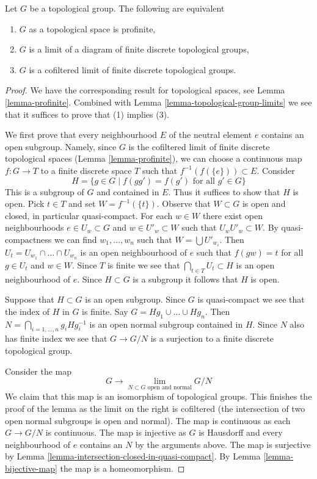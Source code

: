 \begin{lemma}
\label{lemma-profinite-group}
Let $G$ be a topological group. The following are equivalent
\begin{enumerate}
\item $G$ as a topological space is profinite,
\item $G$ is a limit of a diagram of finite discrete topological groups,
\item $G$ is a cofiltered limit of finite discrete topological groups.
\end{enumerate}
\end{lemma}

\begin{proof}
We have the corresponding result for topological spaces, see
Lemma \ref{lemma-profinite}. Combined with
Lemma \ref{lemma-topological-group-limits}
we see that it suffices to prove that (1) implies (3).

\medskip\noindent
We first prove that every neighbourhood $E$ of the neutral element $e$ contains
an open subgroup. Namely, since $G$ is the cofiltered limit of finite
discrete topological spaces (Lemma \ref{lemma-profinite}),
we can choose a continuous map $f : G \to T$ to a finite discrete
space $T$ such that $f^{-1}(f(\{e\})) \subset E$.
Consider
$$
H = \{g \in G \mid f(gg') = f(g')\text{ for all }g' \in G\}
$$
This is a subgroup of $G$ and contained in $E$. Thus it suffices to
show that $H$ is open. Pick $t \in T$ and set $W = f^{-1}(\{t\})$.
Observe that $W \subset G$ is open and closed, in particular quasi-compact.
For each $w \in W$ there exist open neighbourhoods $e \in U_w \subset G$
and $w \in U'_w \subset W$ such that $U_wU'_w \subset W$.
By quasi-compactness we can find $w_1, \ldots, w_n$ such that
$W = \bigcup U'_{w_i}$. Then
$U_t = U_{w_1} \cap \ldots \cap U_{w_n}$ is an open neighbourhood
of $e$ such that $f(gw) = t$ for all $g \in U_t$ and $w \in W$.
Since $T$ is finite we see that $\bigcap_{t \in T} U_t \subset H$
is an open neighbourhood of $e$. Since $H \subset G$ is a subgroup
it follows that $H$ is open.

\medskip\noindent
Suppose that $H \subset G$ is an open subgroup. Since $G$ is quasi-compact
we see that the index of $H$ in $G$ is finite. Say
$G = Hg_1 \cup \ldots \cup Hg_n$. Then
$N = \bigcap_{i = 1, \ldots, n} g_iHg_i^{-1}$ is
an open normal subgroup contained in $H$. Since $N$ also has finite
index we see that $G \to G/N$ is a surjection to a finite discrete
topological group.

\medskip\noindent
Consider the map
$$
G \longrightarrow \lim_{N \subset G\text{ open and normal}} G/N
$$
We claim that this map is an isomorphism of topological groups.
This finishes the proof of the lemma as the limit on the right
is cofiltered (the intersection of two open normal subgroups is
open and normal). The map is continuous as each $G \to G/N$ is continuous.
The map is injective as $G$ is Hausdorff and every neighbourhood
of $e$ contains an $N$ by the arguments above.
The map is surjective by
Lemma \ref{lemma-intersection-closed-in-quasi-compact}.
By Lemma \ref{lemma-bijective-map} the map is a homeomorphism.
\end{proof}

